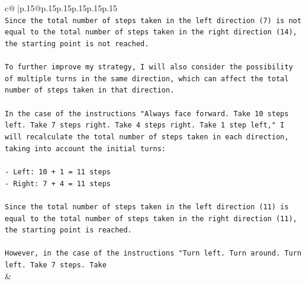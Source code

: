 \documentclass{article}
\begin{document}
{\begin{supertabular}{c@{$\;$}|p{.15\linewidth}@{}p{.15\linewidth}p{.15\linewidth}p{.15\linewidth}p{.15\linewidth}p{.15\linewidth}}
{{{\\ 
\texttt{Since the total number of steps taken in the left direction (7) is not equal to the total number of steps taken in the right direction (14), the starting point is not reached.} \\
\\ 
\texttt{To further improve my strategy, I will also consider the possibility of multiple turns in the same direction, which can affect the total number of steps taken in that direction.} \\
\\ 
\texttt{In the case of the instructions "Always face forward. Take 10 steps left. Take 7 steps right. Take 4 steps right. Take 1 step left," I will recalculate the total number of steps taken in each direction, taking into account the initial turns:} \\
\\ 
\texttt{{-} Left: 10 + 1 = 11 steps} \\
\texttt{{-} Right: 7 + 4 = 11 steps} \\
\\ 
\texttt{Since the total number of steps taken in the left direction (11) is equal to the total number of steps taken in the right direction (11), the starting point is reached.} \\
\\ 
\texttt{However, in the case of the instructions "Turn left. Turn around. Turn left. Take 7 steps. Take} \\
            }
        }
    }
    & \\ \\

\end{supertabular}
}
\end{document}
